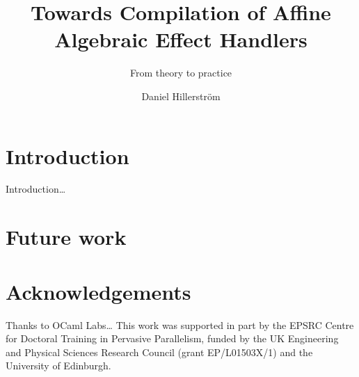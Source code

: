 \documentclass[noback,landscape]{infposter}
\title{Towards Compilation of Affine Algebraic Effect Handlers}
\subtitle{From theory to practice}
\author{Daniel Hillerström}
\begin{document}
\makeposter

\section{Introduction}
Introduction\dots

\section{Future work}

\section{Acknowledgements}
Thanks to OCaml Labs\dots
This work was supported in part by the EPSRC Centre for Doctoral Training in Pervasive Parallelism, funded by the UK Engineering and Physical Sciences Research Council (grant EP/L01503X/1) and the University of Edinburgh.
\end{document}
